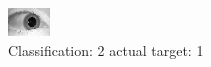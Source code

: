 \begin{figure}[h!]
\begin{center}
\includegraphics[width=0.60\columnwidth]{figures/ID1565_class_2_target_1.png}
\end{center}
\caption{ Classification: 2 actual target: 1}
\label{fig:ID1565_class_2_target_1}
\end{figure}
